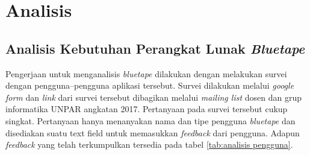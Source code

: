 \chapter{Analisis}
\section{Analisis Kebutuhan Perangkat Lunak \textit{Bluetape}}
Pengerjaan untuk menganalisis \textit{bluetape} dilakukan dengan melakukan survei dengan pengguna--pengguna aplikasi tersebut. Survei dilakukan melalui \textit{google form} dan \textit{link} dari survei tersebut dibagikan melalui \textit{mailing list} dosen dan grup informatika UNPAR angkatan 2017. Pertanyaan pada survei tersebut cukup singkat. Pertanyaan hanya menanyakan nama dan tipe pengguna \textit{bluetape} dan disediakan suatu text field untuk memasukkan \textit{feedback} dari pengguna. Adapun \textit{feedback} yang telah terkumpulkan tersedia pada tabel \ref{tab:analisis pengguna}.

